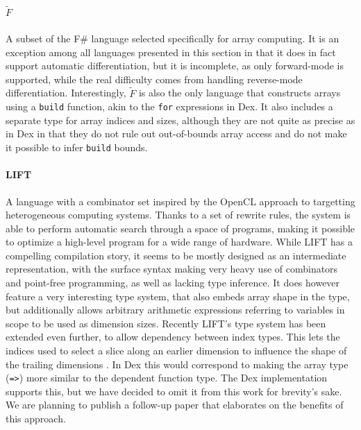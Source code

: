 \documentclass[acmsmall,screen,nonacm]{acmart}
\begin{document}
\paragraph{$\tilde{F}$ \cite{shaikhha2019fsmooth}}
\label{sec:f-smooth}
A subset of the F\# language selected specifically for array computing.
It is an exception among all languages presented in this section in that it does in fact support automatic differentiation, but it is incomplete, as only forward-mode is supported, while the real difficulty comes from handling reverse-mode differentiation.
Interestingly, $\tilde{F}$ is also the only language that constructs arrays using a \verb|build| function, akin to the \verb|for| expressions in Dex.
It also includes a separate type for array indices and sizes, although they are not quite as precise as in Dex in that they do not rule out out-of-bounds array access and do not make it possible to infer \verb|build| bounds.

\paragraph{LIFT \cite{steuwer2017lift}}
\label{sec:lift}
A language with a combinator set inspired by the OpenCL approach to targetting heterogeneous computing systems.
Thanks to a set of rewrite rules, the system is able to perform automatic search through a space of programs, making it possible to optimize a high-level program for a wide range of hardware.
While LIFT has a compelling compilation story, it seems to be mostly designed as an intermediate representation, with the surface syntax making very heavy use of combinators and point-free programming, as well as lacking type inference.
It does however feature a very interesting type system, that also embeds array shape in the type, but additionally allows arbitrary arithmetic expressions referring to variables in scope to be used as dimension sizes.
Recently LIFT's type system has been extended even further, to allow dependency between index types.  This lets the indices used to select a slice along an earlier dimension to influence the shape of the trailing dimensions \cite{pizzuti2019positiondependent}.
In Dex this would correspond to making the array type (\verb|=>|) more similar to the dependent function type. The Dex implementation supports this, but we have decided to omit it from this work for brevity's sake.
We are planning to publish a follow-up paper that elaborates on the benefits of this approach.
\end{document}
